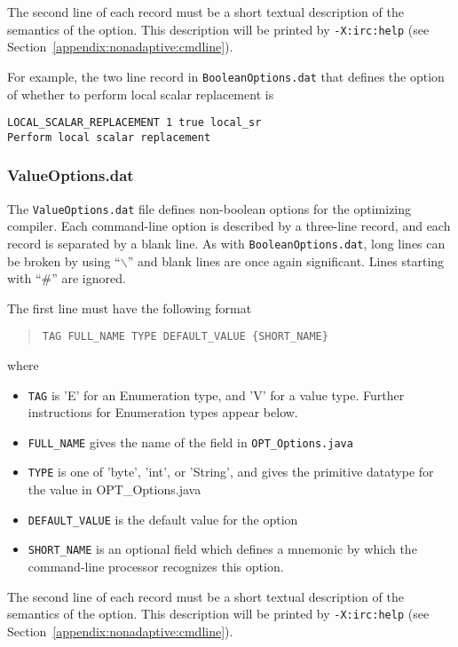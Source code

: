 The second line of each record must be a short textual description of
the semantics of the option.  This description will be printed
by {\tt -X:irc:help} (see Section~\ref{appendix:nonadaptive:cmdline}).

For example, the two line record in {\tt BooleanOptions.dat}
that defines the option of whether
to perform local scalar replacement is
\begin{verbatim}
LOCAL_SCALAR_REPLACEMENT 1 true local_sr
Perform local scalar replacement
\end{verbatim}

\subsubsection{ValueOptions.dat}

The {\tt ValueOptions.dat} file defines non-boolean options for
the optimizing compiler.  Each command-line option is
described by a three-line record, and each record is separated
by a blank line.  As with {\tt BooleanOptions.dat},
long lines can be broken by using ``$\backslash$'' and
blank lines are once again significant.
Lines starting with ``\#'' are ignored.

The first line must have the following format
\begin{quote}
\begin{verbatim}
TAG FULL_NAME TYPE DEFAULT_VALUE {SHORT_NAME}
\end{verbatim}
\end{quote}
where
\begin{itemize}
\item {\tt TAG} is 'E' for an Enumeration type, and 'V' for a value type.  Further instructions for Enumeration types appear below.
\item {\tt FULL\_NAME} gives the name of the field in {\tt OPT\_Options.java}
\item {\tt TYPE} is one of 'byte', 'int', or 'String', and gives the primitive datatype for the value in OPT\_Options.java
\item {\tt DEFAULT\_VALUE} is the default value for the option
\item {\tt SHORT\_NAME} is an optional field which defines a mnemonic by which the command-line processor recognizes this option.
\end{itemize}

The second line of each record must be a short textual description of
the semantics of the option.  This description will be printed
by {\tt -X:irc:help} (see Section~\ref{appendix:nonadaptive:cmdline}).

